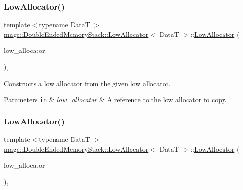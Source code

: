 \subsubsection{\texorpdfstring{Low\+Allocator()}{LowAllocator()}\hspace{0.1cm}{\footnotesize\ttfamily [1/4]}}
{\footnotesize\ttfamily template$<$typename DataT $>$ \\
\hyperlink{structmage_1_1_double_ended_memory_stack_1_1_low_allocator}{mage\+::\+Double\+Ended\+Memory\+Stack\+::\+Low\+Allocator}$<$ DataT $>$\+::\hyperlink{structmage_1_1_double_ended_memory_stack_1_1_low_allocator}{Low\+Allocator} (\begin{DoxyParamCaption}\item[{const \hyperlink{structmage_1_1_double_ended_memory_stack_1_1_low_allocator}{Low\+Allocator}$<$ DataT $>$ \&}]{low\+\_\+allocator }\end{DoxyParamCaption})\hspace{0.3cm}{\ttfamily [default]}, {\ttfamily [noexcept]}}

Constructs a low allocator from the given low allocator.


\begin{DoxyParams}[1]{Parameters}
\mbox{\tt in}  & {\em low\+\_\+allocator} & A reference to the low allocator to copy. \\
\hline
\end{DoxyParams}
\hypertarget{structmage_1_1_double_ended_memory_stack_1_1_low_allocator_ae72c7a214cad73bed8a3503b168ad960}{}\label{structmage_1_1_double_ended_memory_stack_1_1_low_allocator_ae72c7a214cad73bed8a3503b168ad960} 
\subsubsection{\texorpdfstring{Low\+Allocator()}{LowAllocator()}\hspace{0.1cm}{\footnotesize\ttfamily [2/4]}}
{\footnotesize\ttfamily template$<$typename DataT $>$ \\
\hyperlink{structmage_1_1_double_ended_memory_stack_1_1_low_allocator}{mage\+::\+Double\+Ended\+Memory\+Stack\+::\+Low\+Allocator}$<$ DataT $>$\+::\hyperlink{structmage_1_1_double_ended_memory_stack_1_1_low_allocator}{Low\+Allocator} (\begin{DoxyParamCaption}\item[{\hyperlink{structmage_1_1_double_ended_memory_stack_1_1_low_allocator}{Low\+Allocator}$<$ DataT $>$ \&\&}]{low\+\_\+allocator }\end{DoxyParamCaption})\hspace{0.3cm}{\ttfamily [default]}, {\ttfamily [noexcept]}}

